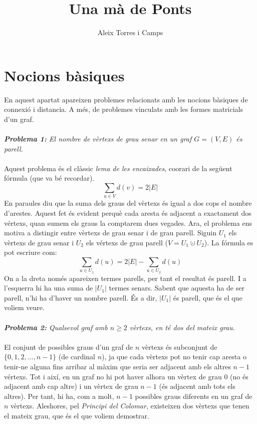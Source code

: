 \documentclass[10pt]{article}
\title{Una mà de Ponts}
\author{Aleix Torres i Camps}
\begin{document}
\maketitle
\section{Nocions bàsiques}
En aquest apartat apareixen problemes relacionats amb les nocions bàsiques de connexió i distancia. A més, de problemes vinculats amb les formes matricials d'un graf. \\ \\

\textsl{\textbf{Problema 1:} El nombre de vèrtexs de grau senar en un graf $G = (V, E)$ és parell.} \\ \\
Aquest problema és el clàssic \textit{lema de les encaixades}, co\lgem orari de la següent fórmula (que va bé recordar).
$$ 
\sum_{u\in V} d(v) = 2 |E|
$$
En paraules diu que la suma dels graus del vèrtexs és igual a dos cops el nombre d'arestes. Aquest fet és evident perquè cada aresta és adjacent a exactament dos vértexs, quan sumem els graus la comptarem dues vegades. Ara, el problema ens motiva a distingir entre vèrtexs de grau senar i de grau parell. Siguin $U_1$ els vèrtexs de grau senar i $U_2$ els vértexs de grau parell ($V = U_1 \cupdot U_2$). La fórmula es pot escriure com:
$$
\sum_{u\in U_1} d(u) = 2 |E| - \sum_{u\in U_2} d(u)
$$
On a la dreta només apareixen termes parells, per tant el resultat és parell. I a l'esquerra hi ha una suma de $|U_1|$ termes senars. Sabent que aquesta ha de ser parell, n'hi ha d'haver un nombre parell. És a dir, $|U_1|$ és parell, que és el que voliem veure. \\ \\

\textsl{\textbf{Problema 2:} Qualsevol graf amb $n\geq2$ vèrtexs, en té dos del mateix grau.} \\ \\
El conjunt de possibles graus d'un graf de $n$ vèrtexs és subconjunt de $\{0,1,2,...,n-1\}$ (de cardinal $n$), ja que cada vèrtexs pot no tenir cap aresta o tenir-ne alguna fins arribar al màxim que seria ser adjacent amb els altres $n-1$ vértexs. Tot i així, en un graf no hi pot haver alhora un vèrtex de grau 0 (no és adjacent amb cap altre) i un vèrtex de grau $n-1$ (és adjacent amb tots els altres). Per tant, hi ha, com a molt, $n-1$ possibles graus diferents en un graf de $n$ vèrtexs. Aleshores, pel \textsl{Principi del Colomar}, existeixen dos vèrtexs que tenen el mateix grau, que és el que voliem demostrar. \\ \\
\end{document}
